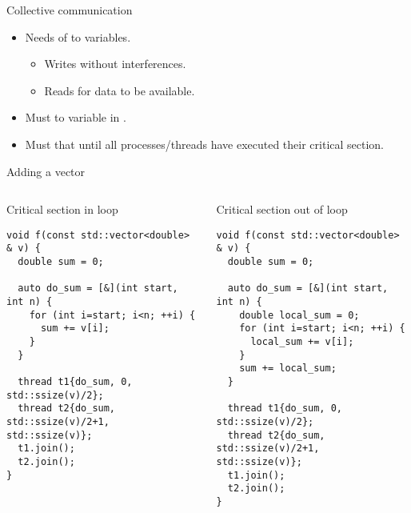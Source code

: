 \begin{frame}[t]{Collective communication}
\begin{itemize}
  \item Needs  of  to variables.
    \begin{itemize}
      \item Writes without interferences.
      \item Reads  for data to be available.
    \end{itemize}

  \item Must  to variable in .

  \item Must  that  
        until all processes/threads have executed their critical section.
  
\end{itemize}
\end{frame}

\begin{frame}[fragile]{Adding a vector}
\begin{columns}[T]

\begin{block}{Critical section in loop}
\begin{lstlisting}
void f(const std::vector<double> & v) {
  double sum = 0;
  
  auto do_sum = [&](int start, int n) {
    for (int i=start; i<n; ++i) {
      sum += v[i];
    }
  }

  thread t1{do_sum, 0, std::ssize(v)/2};
  thread t2{do_sum, std::ssize(v)/2+1, std::ssize(v)};
  t1.join();
  t2.join();
}
\end{lstlisting}
\end{block}


\begin{block}{Critical section out of loop}
\begin{lstlisting}
void f(const std::vector<double> & v) {
  double sum = 0;
  
  auto do_sum = [&](int start, int n) {
    double local_sum = 0;
    for (int i=start; i<n; ++i) {
      local_sum += v[i];
    }
    sum += local_sum;
  }

  thread t1{do_sum, 0, std::ssize(v)/2};
  thread t2{do_sum, std::ssize(v)/2+1, std::ssize(v)};
  t1.join();
  t2.join();
}
\end{lstlisting}
\end{block}

\end{columns}
\end{frame}
